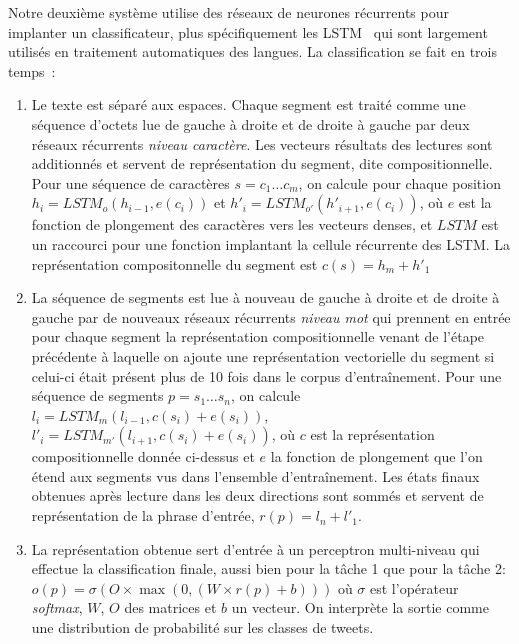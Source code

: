 Notre deuxième système utilise des réseaux de neurones récurrents pour implanter un classificateur, plus spécifiquement les LSTM~\cite{hochreiter1997long} qui sont largement utilisés en traitement automatiques des langues.
La classification se fait en trois temps~:
\begin{enumerate}
\item Le texte est séparé aux espaces.
  Chaque segment est traité comme une séquence d'octets lue de gauche à droite et de droite à gauche par deux réseaux récurrents \emph{niveau caractère}.
  Les vecteurs résultats des lectures sont additionnés et servent de représentation du segment, dite compositionnelle.
  Pour une séquence de caractères $s = c_{1}\ldots c_{m}$, on calcule pour chaque position $h_{i} = LSTM_{o}(h_{i-1},e(c_{i}))$ et $h'_{i} = LSTM_{o'}(h'_{i+1},e(c_{i}))$, où $e$ est la fonction de plongement des caractères vers les vecteurs denses, et $LSTM$ est un raccourci pour une fonction  implantant la cellule récurrente des {LSTM}.
  La représentation compositonnelle du segment est $c(s) = h_{m} + h'_{1}$

\item La séquence de segments est lue à nouveau de gauche à droite et de droite à gauche par de nouveaux réseaux récurrents \emph{niveau mot} qui prennent en entrée pour chaque segment la représentation compositionnelle venant de l'étape précédente à laquelle on ajoute une représentation vectorielle du segment si celui-ci était présent  plus de 10 fois dans le corpus d'entraînement.
  Pour une séquence de segments $p = s_{1} \ldots s_{n}$, on calcule
  $l_{i} = LSTM_{m}(l_{i-1},c(s_{i}) + e(s_{i}))$, $l'_{i} =
  LSTM_{m'}(l_{i+1},c(s_{i}) + e(s_{i}))$, où $c$ est la représentation compositionnelle donnée ci-dessus et $e$ la fonction de plongement que l'on étend aux segments vus dans l'ensemble d'entraînement.
  Les états finaux obtenues après lecture dans les deux directions sont sommés et servent de représentation de la phrase d'entrée, $r(p) = l_{n} + l'_{1}$.

\item La représentation obtenue sert d'entrée à un perceptron multi-niveau qui effectue la classification finale, aussi bien pour la tâche 1 que pour la tâche 2:  $o(p) = \sigma(O \times \max(0, (W \times r(p) + b)))$ où $\sigma$ est l'opérateur \emph{softmax}, $W$, $O$ des matrices et $b$ un vecteur. On interprète la sortie comme une distribution de probabilité sur les classes de tweets.
\end{enumerate}


